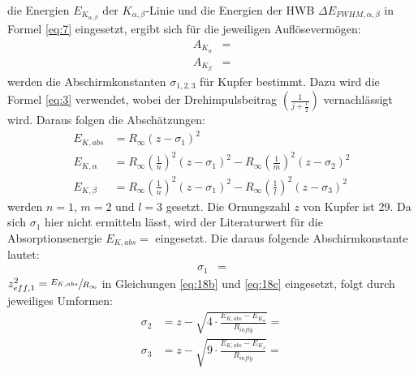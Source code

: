     \justifying die Energien $E_{K_{\alpha, \beta}}$ der $K_{\alpha,\beta}$-Linie und die Energien der HWB 
    $\Delta E_{FWHM, \alpha, \beta}$ in Formel \eqref{eq:7} eingesetzt, ergibt sich für die jeweiligen Auflösevermögen:
    \begin{subequations}\label{eq:17}
    \begin{align}
        A_{K_{\alpha}} &= \text{} \label{eq:17a}\\
        A_{K_{\beta}} &= \text{} \label{eq:17b}
    \end{align}
    \end{subequations}
    \justifying werden die Abschirmkonstanten $\sigma_{1,2,3}$ für Kupfer bestimmt. Dazu wird die Formel \eqref{eq:3}
    verwendet, wobei der Drehimpulsbeitrag $\left( \frac{1}{j+\frac{1}{2}} \right)$ vernachlässigt wird. Daraus folgen die Abschätzungen:
    \begin{subequations}\label{eq:18}
    \begin{align}
        E_{K,abs} &= R_{\infty} (z-\sigma_1)^2 \label{eq:18a}\\
        E_{K,\alpha} &= R_{\infty} \left( \frac{1}{n} \right)^2 (z-\sigma_1)^2 - R_{\infty} \left( \frac{1}{m} \right)^2 (z-\sigma_2)^2 \label{eq:18b}\\
        E_{K,\beta} &= R_{\infty} \left( \frac{1}{n} \right)^2 (z-\sigma_1)^2 - R_{\infty} \left( \frac{1}{l} \right)^2 (z-\sigma_3)^2 \label{eq:18c}
    \end{align}
    \end{subequations}
    \justifying werden $n=1$, $m=2$ und $l=3$ gesetzt. Die Ornungszahl $z$ von Kupfer ist 29. Da sich $\sigma_1$ hier nicht ermitteln lässt, 
    wird der Literaturwert für die Absorptionsenergie $E_{K,abs}= \text{}$ eingesetzt. Die daraus folgende 
    Abschirmkonstante lautet:
    \begin{align}
        \sigma_1 &= \text{} \label{eq:19}
    \end{align}
    \justifying $z_{eff,1}^2=\sfrac{E_{K,abs}}{R_{\infty}}$ in Gleichungen \eqref{eq:18b} und \eqref{eq:18c} eingesetzt,
    folgt durch jeweiliges Umformen:
    \begin{subequations}\label{eq:20}
    \begin{align}
        \sigma_2 &= z-\sqrt{4\cdot\frac{E_{K,abs}-E_{K_{\alpha}}}{R_{infty}}} = \text{} \label{eq:20a}\\
        \sigma_3 &= z-\sqrt{9\cdot\frac{E_{K,abs}-E_{K_{\beta}}}{R_{infty}}} = \text{} \label{eq:20b}
    \end{align}
    \end{subequations}

